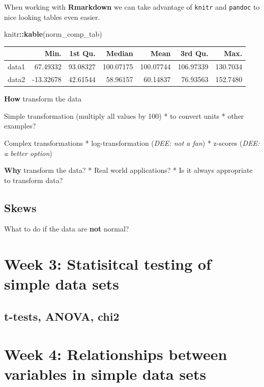 \documentclass[
]{book}
\newenvironment{Shaded}{\begin{snugshade}}{\end{snugshade}}
\newcommand{\KeywordTok}[1]{\textcolor[rgb]{0.13,0.29,0.53}{\textbf{#1}}}
\newcommand{\NormalTok}[1]{#1}
\newcommand{\OperatorTok}[1]{\textcolor[rgb]{0.81,0.36,0.00}{\textbf{#1}}}
\begin{document}
When working with \textbf{Rmarkdown} we can take advantage of \texttt{knitr} and \texttt{pandoc} to nice looking tables even easier.

\begin{Shaded}
\begin{Highlighting}[]
\NormalTok{knitr}\OperatorTok{::}\KeywordTok{kable}\NormalTok{(norm_comp_tab)}
\end{Highlighting}
\end{Shaded}

\begin{tabular}{l|r|r|r|r|r|r}
\hline
  & Min. & 1st Qu. & Median & Mean & 3rd Qu. & Max.\\
\hline
data1 & 67.49332 & 93.08327 & 100.07175 & 100.07744 & 106.97339 & 130.7034\\
\hline
data2 & -13.32678 & 42.61544 & 58.96157 & 60.14837 & 76.93563 & 152.7480\\
\hline
\end{tabular}

\textbf{How} transform the data

Simple transformation (multiply all values by 100)
* to convert units
* other examples?

Complex transformations
* log-transformation (\emph{DEE: not a fan})
* z-scores (\emph{DEE: a better option})

\textbf{Why} transform the data?
* Real world applications?
* Is it always appropriate to transform data?

\hypertarget{skews}{%
\subsection{Skews}\label{skews}}

What to do if the data are \textbf{not} normal?

\hypertarget{week-3-statisitcal-testing-of-simple-data-sets-1}{%
\section{Week 3: Statisitcal testing of simple data sets}\label{week-3-statisitcal-testing-of-simple-data-sets-1}}

\hypertarget{t-tests-anova-chi2}{%
\subsection{t-tests, ANOVA, chi2}\label{t-tests-anova-chi2}}

\hypertarget{week-4-relationships-between-variables-in-simple-data-sets}{%
\section{Week 4: Relationships between variables in simple data sets}\label{week-4-relationships-between-variables-in-simple-data-sets}}
\end{document}
